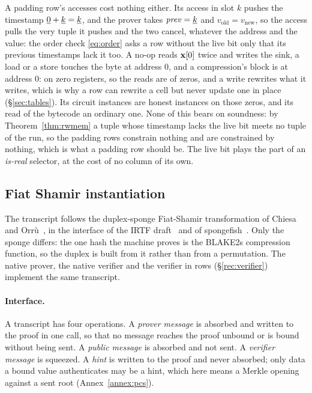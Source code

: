 A padding row's accesses cost nothing either. Its access in slot $k$ pushes the timestamp $\underline{0}+\underline{k}=\underline{k}$, and the prover takes $\mathit{prev}=\underline{k}$ and $v_{\mathrm{old}}=v_{\mathrm{new}}$, so the access pulls the very tuple it pushes and the two cancel, whatever the address and the value: the order check \eqref{eq:order} asks a row without the live bit only that its previous timestamps lack it too. A no-op reads $\mathbf{x}[0]$ twice and writes the sink, a load or a store touches the byte at address $0$, and a compression's block is at address $0$: on zero registers, so the reads are of zeros, and a write rewrites what it writes, which is why a row can rewrite a cell but never update one in place (\S\ref{sec:tables}). Its circuit instances are honest instances on those zeros, and its read of the bytecode an ordinary one. None of this bears on soundness: by Theorem~\ref{thm:rwmem} a tuple whose timestamp lacks the live bit meets no tuple of the run, so the padding rows constrain nothing and are constrained by nothing, which is what a padding row should be. The live bit plays the part of an \emph{is-real} selector, at the cost of no column of its own.

\subsection{Fiat Shamir instantiation}\label{sec:e2e-fiat-shamir}

The transcript follows the duplex-sponge Fiat-Shamir transformation of Chiesa and Orr\`u~\cite{CO25}, in the interface of the IRTF draft~\cite{IRTF-FS} and of spongefish~\cite{spongefish}. Only the sponge differs: the one hash the machine proves is the BLAKE2s compression function, so the duplex is built from it rather than from a permutation. The native prover, the native verifier and the verifier in rows (\S\ref{rec:verifier}) implement the same transcript.

\paragraph{Interface.} A transcript has four operations. A \emph{prover message} is absorbed and written to the proof in one call, so that no message reaches the proof unbound or is bound without being sent. A \emph{public message} is absorbed and not sent. A \emph{verifier message} is squeezed. A \emph{hint} is written to the proof and never absorbed; only data a bound value authenticates may be a hint, which here means a Merkle opening against a sent root (Annex~\ref{annex:pcs}).

